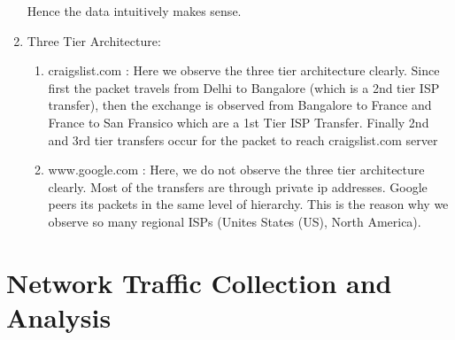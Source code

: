 \documentclass[12pt]{article}
\begin{document}
\begin{enumerate}
    Hence the data intuitively makes sense.
    
    \item Three Tier Architecture:
    \begin{enumerate}
        \item craigslist.com : Here we observe the three tier architecture clearly. Since first the packet travels from Delhi to Bangalore (which is a 2nd tier ISP transfer), then the exchange is observed from Bangalore to France and France to San Fransico which are a 1st Tier ISP Transfer. Finally 2nd and 3rd tier transfers occur for the packet to reach craigslist.com server
        \item www.google.com : Here, we do not observe the three tier architecture clearly. Most of the transfers are through private ip addresses. Google peers its packets in the same level of hierarchy. This is the reason why we observe so many regional ISPs (Unites States (US), North America).
    \end{enumerate}
\end{enumerate}

\section{Network Traffic Collection and Analysis}
\end{document}

